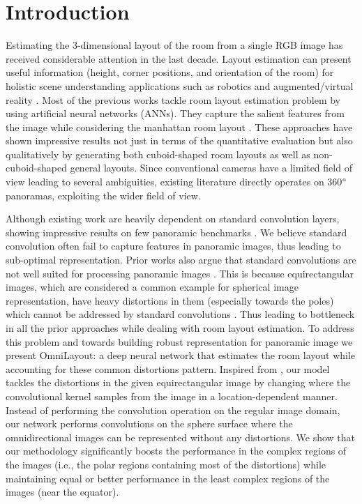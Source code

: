 \documentclass[final]{cvpr}
\begin{document}
\section{Introduction}\label{sec:intro}
Estimating the 3-dimensional layout of the room from a single RGB image has received considerable attention in the last decade. Layout estimation can present useful information (height, corner positions, and orientation of the room)  for holistic scene understanding applications such as robotics and augmented/virtual reality \cite{sun2020hohonet,fernandez2020indoor}. Most of the previous works \cite{sun2019horizonnet,yang2019dula,zou2018layoutnet} tackle room layout estimation problem by using artificial neural networks (ANNs).  They capture the salient features from the image while considering the manhattan room layout \cite{coughlan1999manhattan}. These approaches have shown impressive results not just in terms of the quantitative evaluation but also qualitatively by generating both cuboid-shaped room layouts as well as non-cuboid-shaped general layouts. Since conventional cameras have a limited field of view leading to several ambiguities, existing literature \cite{sun2019horizonnet,yang2019dula,zou2018layoutnet, fernandez2020corners} directly operates on 360$\degree$ panoramas, exploiting the wider field of view.




Although existing work are heavily dependent on standard convolution layers, showing impressive results on few panoramic benchmarks \cite{sun2019horizonnet,yang2019dula,zou2018layoutnet}. We believe standard convolution often fail to capture features in panoramic images, thus leading to sub-optimal representation. Prior works also argue that standard convolutions are not well suited for processing panoramic images \cite{coors2018spherenet,eder2019mapped}. This is because equirectangular images, which are considered a common example for spherical image representation, have heavy distortions in them (especially towards the poles) which cannot be addressed by standard convolutions \cite{coors2018spherenet, eder2019mapped}. Thus leading to bottleneck in all the prior approaches while dealing with room layout estimation. 
To address this problem and towards building robust representation for panoramic image we present OmniLayout: a deep neural network that estimates the room layout while accounting for these common distortions pattern. Inspired from \cite{coors2018spherenet}, our model tackles the distortions in the given equirectangular image by changing where the convolutional kernel samples from the image in a location-dependent manner. Instead of performing the convolution operation on the regular image domain, our network performs convolutions on the sphere surface where the omnidirectional images can be represented without any distortions. We show that our methodology significantly boosts the performance in the complex regions of the images (i.e., the polar regions containing most of the distortions) while maintaining equal or better performance in the least complex regions of the images (near the equator).
\end{document}
